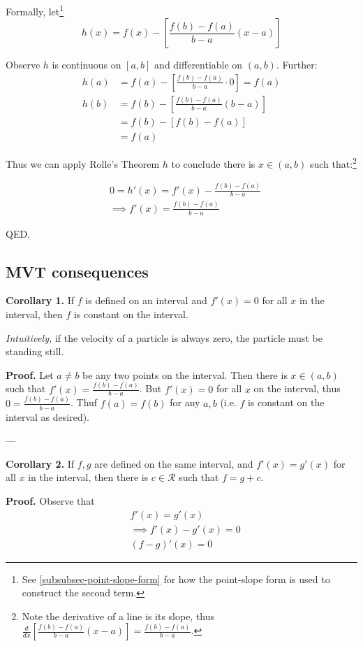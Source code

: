 Formally, let\footnote{See \ref{subsubsec-point-slope-form} for how
  the point-slope form is used to construct the second term.}
\[h(x)=f(x)-\left[\frac{f(b)-f(a)}{b-a}(x-a)\right]\]

Observe $h$ is continuous on $[a,b]$ and differentiable on $(a,b)$.
Further:
\begin{align*}
  h(a)&=f(a)-\left[\frac{f(b)-f(a)}{b-a}\cdot0\right]=f(a)\\
  h(b)&=f(b)-\left[\frac{f(b)-f(a)}{b-a}(b-a)\right]\\
      &=f(b)-[f(b)-f(a)]\\
      &=f(a)
\end{align*}

Thus we can apply Rolle's Theorem $h$ to conclude there is $x\in(a,b)$
such that:\footnote{Note the derivative of a line is its slope, thus
  $\frac{d}{dx}\left[\frac{f(b)-f(a)}{b-a}(x-a)\right]=\frac{f(b)-f(a)}{b-a}$.}

\begin{align*}
  &0=h'(x)=f'(x)-\frac{f(b)-f(a)}{b-a}\\
  &\implies f'(x)=\frac{f(b)-f(a)}{b-a}
\end{align*}

QED.


\subsection{MVT consequences}
\textbf{Corollary 1.} If $f$ is defined on an interval and $f'(x)=0$
for all $x$ in the interval, then $f$ is constant on the interval.

\vs

\textit{Intuitively,} if the velocity of a particle is always zero,
the particle must be standing still.

\vs

\textbf{Proof.} Let $a\neq b$ be any two points on the interval. Then
there is $x\in(a,b)$ such that $f'(x)=\frac{f(b)-f(a)}{b-a}$. But
$f'(x)=0$ for all $x$ on the interval, thus $0=\frac{f(b)-f(a)}{b-a}$.
Thuf $f(a)=f(b)$ for any $a,b$ (i.e. $f$ is constant on the interval
as desired).

\vs---\vs

\textbf{Corollary 2.} If $f,g$ are defined on the same interval, and
$f'(x)=g'(x)$ for all $x$ in the interval, then there is
$c\in\mathcal{R}$ such that $f=g+c$.

\vs

\textbf{Proof.} Observe that
\begin{align*}
  &f'(x)=g'(x)\\
  &\implies f'(x)-g'(x)=0\\
  &(f-g)'(x)=0
\end{align*}

